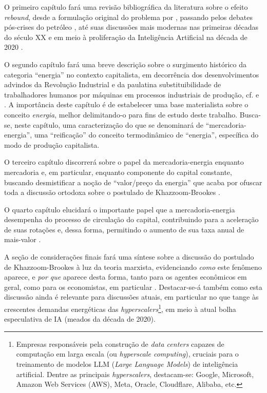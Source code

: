 O primeiro capítulo fará uma revisão bibliográfica da literatura sobre o efeito \textit{rebound}, desde a formulação original do problema por \textcite{Jevons1866}, passando pelos debates pós-crises do petróleo \parencite{Khazzoom1980,Khazzoom1987,Keepin1988,Keepin1989,Jones1989, Brookes1990,Brookes1992,Brookes1993,Grubb1990,Grubb1992,Saunders1992}, até suas discussões mais modernas nas primeiras décadas do século XX \parencite{Brookes2000,Saunders2009,Sorrell2007,Sorrell2009,Hanley2009,Gillingham2015} e em meio à proliferação da Inteligência Artificial na década de 2020 \parencite{Ozsoy2024,Mikalauskas2025}. 

O segundo capítulo fará uma breve descrição sobre o surgimento histórico da categoria ``energia'' no contexto capitalista, em decorrência dos desenvolvimentos advindos da Revolução Industrial e da paulatina substituibilidade de trabalhadores humanos por máquinas em processos industriais de produção, cf. \textcite{Pasquinelli2022,Pasquinelli2023} e \textcite{Malm2013}. A importância deste capítulo é de estabelecer uma base materialista sobre o conceito \textit{energia}, melhor delimitando-o para fins de estudo deste trabalho. Busca-se, neste capítulo, uma caracterização do que se denominará de ``mercadoria-energia'', uma ``reificação'' do conceito termodinâmico de ``energia'', específica do modo de produção capitalista.

O terceiro capítulo discorrerá sobre o papel da mercadoria-energia enquanto mercadoria e, em particular, enquanto componente do capital constante, buscando desmistificar a noção de ``valor/preço da energia'' que acaba por ofuscar toda a discussão ortodoxa sobre o postulado de Khazzoom-Brookes \parencite{Marx2017,SaBarreto2018}. 

O quarto capítulo elucidará o importante papel que a mercadoria-energia desempenha do processo de circulação do capital, contribuindo para a aceleração de suas rotações e, dessa forma, permitindo o aumento de sua taxa anual de mais-valor \cite{Marx2014,SaBarreto2018,SaBarreto2022}.

A seção de considerações finais fará uma síntese sobre a discussão do postulado de Khazzoom-Brookes à luz da teoria marxista, evidenciando \textit{como} este fenômeno aparece, e \textit{por que} aparece desta forma, tanto para os agentes econômicos em geral, como para os economistas, em particular \parencite{Medeiros2013,Lawson1997,Bhaskar1978,Bhaskar1998}. Destacar-se-á também como esta discussão ainda é relevante para discussões atuais, em particular no que tange às crescentes demandas energéticas das \textit{hyperscalers}\footnote{Empresas responsáveis pela construção de \textit{data centers} capazes de computação em larga escala (ou \textit{hyperscale computing}), cruciais para o treinamento de modelos LLM (\textit{Large Language Models}) de inteligência artificial. Dentre as principais \textit{hyperscalers}, destacam-se: Google, Microsoft, Amazon Web Services (AWS), Meta, Oracle, Cloudflare, Alibaba, etc.}, em meio à atual bolha especulativa de IA (meados da década de 2020).


